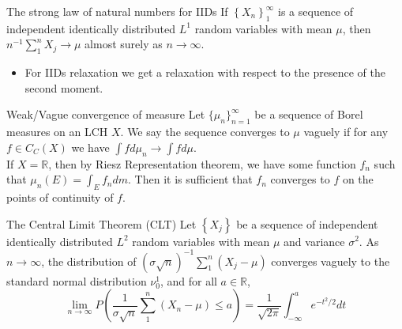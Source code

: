 \documentclass{beamer}
\begin{document}
\begin{frame}{The strong law of natural numbers for IIDs}
    If $\left\{X_n\right\}_1^{\infty}$ is a sequence of independent identically distributed $L^1$ random variables with mean $\mu$, then $n^{-1} \sum_1^n X_j \rightarrow \mu$ almost surely as $n \rightarrow \infty$.    \pause\\
    \begin{itemize}
        \item For IIDs relaxation we get a relaxation with respect to the presence of the second moment.
    \end{itemize}
\end{frame}


\begin{frame}{Weak/Vague convergence of measure}
 Let $\{\mu_n\}_{n=1}^\infty$ be a sequence of Borel measures on an LCH $X$. We say the \textcolor{colorblue}{sequence converges to $\mu$ vaguely} if for any $f\in C_C(X)$  we have $\int fd\mu_n\to \int f d\mu$.\pause\\
 If $X=\mathbb R$, then by Riesz Representation theorem, we have some function $f_n$ such that $\mu_n(E)=\int_E f_ndm$. Then it is sufficient that $f_n$ converges to $f$ on the points of continuity of $f$. 
\end{frame}

\begin{frame}{The Central Limit Theorem (CLT)}
    Let $\left\{X_j\right\}$ be a sequence of independent identically distributed $L^2$ random variables with mean $\mu$ and variance $\sigma^2$. As $n \rightarrow \infty$, the distribution of $(\sigma \sqrt{n})^{-1} \sum_1^n\left(X_j-\mu\right)$ converges vaguely to the standard normal distribution $\nu_0^1$, and for all $a \in \mathbb{R}$,
$$
\lim _{n \rightarrow \infty} P\left(\frac{1}{\sigma \sqrt{n}} \sum_1^n\left(X_n-\mu\right) \leq a\right)=\frac{1}{\sqrt{2 \pi}} \int_{-\infty}^a e^{-t^2 / 2} d t
$$
\end{frame}


\end{document}
